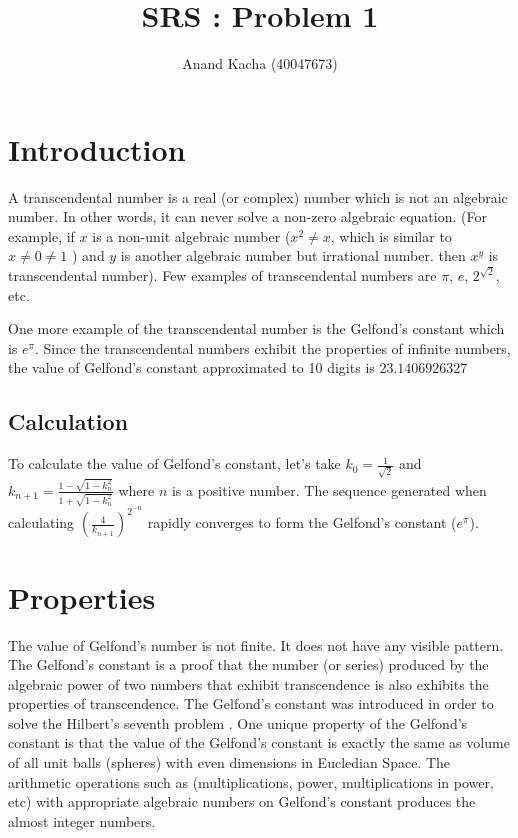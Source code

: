 \documentclass{article}
\title{SRS : Problem 1}
\author{Anand Kacha (40047673)}
\begin{document}
\maketitle

\section{Introduction}
\justifying
A transcendental number \cite{transcendental} is a real (or complex) number which is not an algebraic number. In other words, it can never solve a non-zero algebraic equation. (For example, if $x$ is a non-unit algebraic number ($x^2 \ne x$, which is similar to $x \ne 0 \ne 1$ ) and $y$ is another algebraic number but irrational number. then $x^y$ is transcendental number). Few examples of transcendental numbers are $\pi$, $e$, $2^{\sqrt{2}}$, etc.
\begin{flushleft}
\justifying
One more example of the transcendental number is the Gelfond's constant \cite{gelfondsconstant} which is $e^{\pi}$. Since the transcendental numbers exhibit the properties of infinite numbers, the value of Gelfond's constant approximated to 10 digits is $23.1406926327$
\end{flushleft}

\subsection{Calculation}
\begin{flushleft}
\justifying
To calculate the value of Gelfond's constant, let's take $k_0 = \frac{1}{\sqrt{2}}$ and $k_{n+1} = \frac{1 - \sqrt{1 - k_n^2}}{1 + \sqrt{1 - k_n^2}}$ where $n$ is a positive number. The sequence generated when calculating $(\frac{4}{k_{n+1}})^{2^{-n}}$ rapidly converges to form the Gelfond's constant ($e^\pi$).
\end{flushleft}

\section{Properties}
\begin{flushleft}
\justifying
The value of Gelfond's number is not finite. It does not have any visible pattern. The Gelfond's constant is a proof that the number (or series) produced by the algebraic power of two numbers that exhibit transcendence is also exhibits the properties of transcendence. The Gelfond's constant was introduced in order to solve the Hilbert's seventh problem \cite{hilbertsproblems}. One unique property of the Gelfond's constant is that the value of the Gelfond's constant is exactly the same as volume of all unit balls (spheres) with even dimensions in Eucledian Space. The arithmetic operations such as (multiplications, power, multiplications in power, etc) with appropriate algebraic numbers on Gelfond's constant produces the almost integer numbers.
\end{flushleft}
\end{document}
